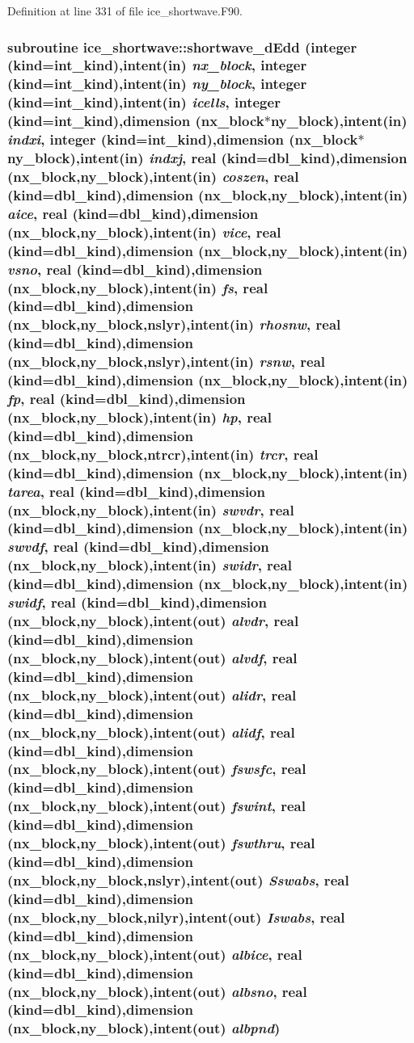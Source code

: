 Definition at line 331 of file ice\_\-shortwave.F90.\hypertarget{namespaceice__shortwave_a628868bc140ea7881708332dd8ef24d4}{
\subsubsection[{shortwave\_\-dEdd}]{\setlength{\rightskip}{0pt plus 5cm}subroutine ice\_\-shortwave::shortwave\_\-dEdd (integer (kind=int\_\-kind),intent(in) {\em nx\_\-block}, \/  integer (kind=int\_\-kind),intent(in) {\em ny\_\-block}, \/  integer (kind=int\_\-kind),intent(in) {\em icells}, \/  integer (kind=int\_\-kind),dimension (nx\_\-block$\ast$ny\_\-block),intent(in) {\em indxi}, \/  integer (kind=int\_\-kind),dimension (nx\_\-block$\ast$ny\_\-block),intent(in) {\em indxj}, \/  real (kind=dbl\_\-kind),dimension (nx\_\-block,ny\_\-block),intent(in) {\em coszen}, \/  real (kind=dbl\_\-kind),dimension (nx\_\-block,ny\_\-block),intent(in) {\em aice}, \/  real (kind=dbl\_\-kind),dimension (nx\_\-block,ny\_\-block),intent(in) {\em vice}, \/  real (kind=dbl\_\-kind),dimension (nx\_\-block,ny\_\-block),intent(in) {\em vsno}, \/  real (kind=dbl\_\-kind),dimension (nx\_\-block,ny\_\-block),intent(in) {\em fs}, \/  real (kind=dbl\_\-kind),dimension (nx\_\-block,ny\_\-block,nslyr),intent(in) {\em rhosnw}, \/  real (kind=dbl\_\-kind),dimension (nx\_\-block,ny\_\-block,nslyr),intent(in) {\em rsnw}, \/  real (kind=dbl\_\-kind),dimension (nx\_\-block,ny\_\-block),intent(in) {\em fp}, \/  real (kind=dbl\_\-kind),dimension (nx\_\-block,ny\_\-block),intent(in) {\em hp}, \/  real (kind=dbl\_\-kind),dimension (nx\_\-block,ny\_\-block,ntrcr),intent(in) {\em trcr}, \/  real (kind=dbl\_\-kind),dimension (nx\_\-block,ny\_\-block),intent(in) {\em tarea}, \/  real (kind=dbl\_\-kind),dimension (nx\_\-block,ny\_\-block),intent(in) {\em swvdr}, \/  real (kind=dbl\_\-kind),dimension (nx\_\-block,ny\_\-block),intent(in) {\em swvdf}, \/  real (kind=dbl\_\-kind),dimension (nx\_\-block,ny\_\-block),intent(in) {\em swidr}, \/  real (kind=dbl\_\-kind),dimension (nx\_\-block,ny\_\-block),intent(in) {\em swidf}, \/  real (kind=dbl\_\-kind),dimension (nx\_\-block,ny\_\-block),intent(out) {\em alvdr}, \/  real (kind=dbl\_\-kind),dimension (nx\_\-block,ny\_\-block),intent(out) {\em alvdf}, \/  real (kind=dbl\_\-kind),dimension (nx\_\-block,ny\_\-block),intent(out) {\em alidr}, \/  real (kind=dbl\_\-kind),dimension (nx\_\-block,ny\_\-block),intent(out) {\em alidf}, \/  real (kind=dbl\_\-kind),dimension (nx\_\-block,ny\_\-block),intent(out) {\em fswsfc}, \/  real (kind=dbl\_\-kind),dimension (nx\_\-block,ny\_\-block),intent(out) {\em fswint}, \/  real (kind=dbl\_\-kind),dimension (nx\_\-block,ny\_\-block),intent(out) {\em fswthru}, \/  real (kind=dbl\_\-kind),dimension (nx\_\-block,ny\_\-block,nslyr),intent(out) {\em Sswabs}, \/  real (kind=dbl\_\-kind),dimension (nx\_\-block,ny\_\-block,nilyr),intent(out) {\em Iswabs}, \/  real (kind=dbl\_\-kind),dimension (nx\_\-block,ny\_\-block),intent(out) {\em albice}, \/  real (kind=dbl\_\-kind),dimension (nx\_\-block,ny\_\-block),intent(out) {\em albsno}, \/  real (kind=dbl\_\-kind),dimension (nx\_\-block,ny\_\-block),intent(out) {\em albpnd})}}
